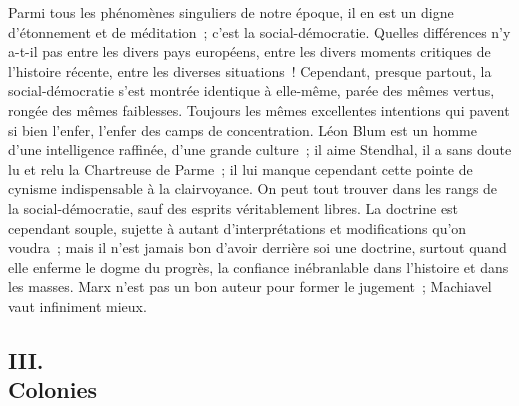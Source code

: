 \documentclass[french,twoside]{book} %
\begin{document}
Parmi tous les phénomènes singuliers de notre époque, il en est un digne d'étonnement et de méditation ; c'est la social-démocratie. Quelles différences n'y a-t-il pas entre les divers pays européens, entre les divers moments critiques de l'histoire récente, entre les diverses situations ! Cependant, pres­que partout, la social-démocratie s'est montrée identique à elle-même, parée des mêmes vertus, rongée des mêmes faiblesses. Toujours les mêmes excel­lentes intentions qui pavent si bien l'enfer, l'enfer des camps de concentration. Léon Blum est un homme d'une intelligence raffinée, d'une grande culture ; il aime Stendhal, il a sans doute lu et relu la Chartreuse de Parme ; il lui manque cependant cette pointe de cynisme indispensable à la clairvoyance. On peut tout trouver dans les rangs de la social-démocratie, sauf des esprits véritable­ment libres. La doctrine est cependant souple, sujette à autant d'interprétations et modifications qu'on voudra ; mais il n'est jamais bon d'avoir derrière soi une doctrine, surtout quand elle enferme le dogme du progrès, la confiance inébranlable dans l'histoire et dans les masses. Marx n'est pas un bon auteur pour former le jugement ; Machiavel vaut infiniment mieux.\par

\begin{center}
\end{center}
\subsection[III. Colonies]{III. \\
Colonies}
\end{document}
